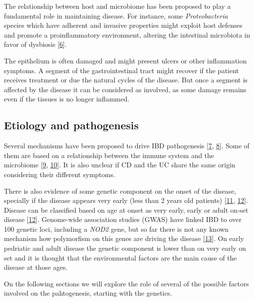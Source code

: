\documentclass[
  12pt,
  a4paper,
  twoside,
  openright]{book}
\begin{document}
The relationship between host and microbiome has been proposed to play a fundamental role in maintaining disease.
For instance, some \emph{Proteobacteria} species which have adherent and invasive properties might exploit host defenses and promote a proinflammatory environment, altering the intestinal microbiota in favor of dysbiosis {[}\protect\hyperlink{ref-mukhopadhya2012}{6}{]}.

The epithelium is often damaged and might present ulcers or other inflammation symptoms.
A segment of the gastrointestinal tract might recover if the patient receives treatment or due the natural cycles of the disease.
But once a segment is affected by the disease it can be considered as involved, as some damage remains even if the tissues is no longer inflammed.

\hypertarget{etiology-and-pathogenesis}{%
\subsection{Etiology and pathogenesis}\label{etiology-and-pathogenesis}}

Several mechanisms have been proposed to drive IBD pathogenesis {[}\protect\hyperlink{ref-zhang2014}{7}, \protect\hyperlink{ref-hugot2004}{8}{]}.
Some of them are based on a relationship between the immune system and the microbiome {[}\protect\hyperlink{ref-silva2016}{9}, \protect\hyperlink{ref-demattos2015}{10}{]}.
It is also unclear if CD and the UC share the same origin considering their different symptoms.

There is also evidence of some genetic component on the onset of the disease, specially if the disease appears very early (less than 2 years old patients) {[}\protect\hyperlink{ref-mcgovern2015}{11}, \protect\hyperlink{ref-satsangi2006}{12}{]}.
Disease can be classified based on age at onset as very early, early or adult on-set disease {[}\protect\hyperlink{ref-satsangi2006}{12}{]}.
Genome-wide association studies (GWAS) have linked IBD to over 100 genetic loci, including a \emph{NOD2} gene, but so far there is not any known mechanism how polymorfism on this genes are driving the disease {[}\protect\hyperlink{ref-horowitz2021}{13}{]}.
On early pedriatic and adult disease the genetic component is lower than on very early on set and it is thought that the environmental factors are the main cause of the disease at those ages.

On the following sections we will explore the role of several of the possible factors involved on the pahtogenesis, starting with the genetics.
\end{document}
